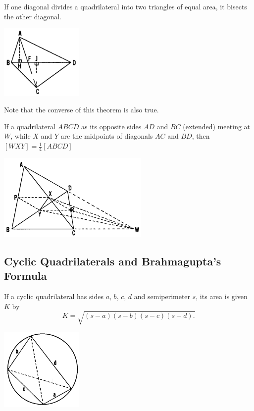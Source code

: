 \documentclass[DIV=12, a4]{scrartcl}
\begin{document}
\begin{theorem}
	If one diagonal divides a quadrilateral into two triangles of equal area, it bisects the other diagonal.
\end{theorem}

 \begin{center}
		\includegraphics[width=0.3\textwidth]{media/3-1D}
\end{center}

Note that the converse of this theorem is also true.

\begin{theorem}
	If a quadrilateral $ABCD$ as its opposite sides $AD$ and $BC$ (extended) meeting at $W$, while $X$ and $Y$ are the midpoints of diagonals $AC$ and $BD$, then
	$[WXY] = \frac{1}{4}[ABCD]$
\end{theorem}

 \begin{center}
		\includegraphics[width=0.55\textwidth]{media/3-1E}
\end{center}

\subsection{Cyclic Quadrilaterals and Brahmagupta's Formula}

\begin{theorem}
	If a cyclic quadrilateral has sides $a$, $b$, $c$, $d$ and semiperimeter $s$, its area is given $K$ by
	$$
	K = \sqrt{(s - a)(s - b)(s - c)(s - d).}
	$$
\end{theorem}

 \begin{center}
		\includegraphics[width=0.3\textwidth]{media/3-2A}
\end{center}
\end{document}
